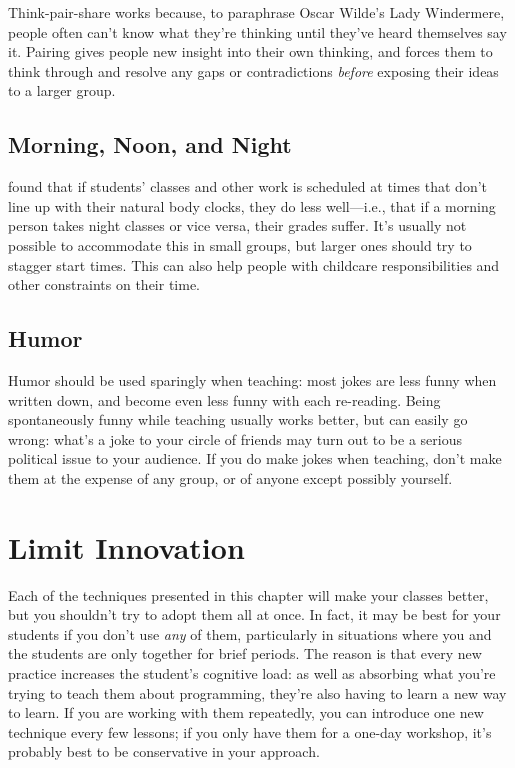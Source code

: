 Think-pair-share works because, to paraphrase Oscar Wilde's Lady
Windermere, people often can't know what they're thinking until they've
heard themselves say it. Pairing gives people new insight into their own
thinking, and forces them to think through and resolve any gaps or
contradictions \emph{before} exposing their ideas to a larger group.

\subsection{Morning, Noon, and Night}\label{morning-noon-and-night}

\cite{Smar2018} found that if students' classes and other work is
scheduled at times that don't line up with their natural body clocks,
they do less well---i.e., that if a morning person takes night classes or
vice versa, their grades suffer. It's usually not possible to
accommodate this in small groups, but larger ones should try to stagger
start times. This can also help people with childcare responsibilities
and other constraints on their time.

\subsection{Humor}\label{humor}

Humor should be used sparingly when teaching: most jokes are less funny
when written down, and become even less funny with each re-reading.
Being spontaneously funny while teaching usually works better, but can
easily go wrong: what's a joke to your circle of friends may turn out to
be a serious political issue to your audience. If you do make jokes when
teaching, don't make them at the expense of any group, or of anyone
except possibly yourself.

\section{Limit Innovation}\label{s:classroom-innovate}

Each of the techniques presented in this chapter will make your classes
better, but you shouldn't try to adopt them all at once. In fact, it may
be best for your students if you don't use \emph{any} of them, particularly
in situations where you and the students are only together for brief
periods. The reason is that every new practice increases the student's
cognitive load: as well as absorbing what you're trying to teach them
about programming, they're also having to learn a new way to learn. If
you are working with them repeatedly, you can introduce one new
technique every few lessons; if you only have them for a one-day
workshop, it's probably best to be conservative in your approach.

